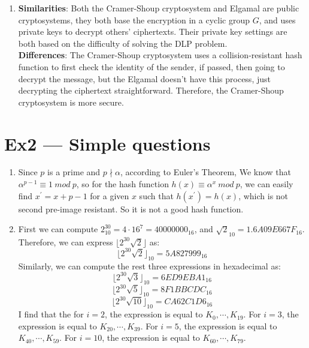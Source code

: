 \documentclass[12pt, a4paper]{article}
\begin{document}
\begin{enumerate}
    \item \textbf{Similarities}: Both the Cramer-Shoup cryptosystem and Elgamal are public cryptosystems, 
          they both base the encryption in a cyclic group $G$, and uses private keys to decrypt others' ciphertexts. 
          Their private key settings are both based on the difficulty of solving the DLP problem.\\
          \textbf{Differences}: The Cramer-Shoup cryptosystem uses a collision-resistant hash function 
          to first check the identity of the sender, if passed, then going to decrypt the message, 
          but the Elgamal doesn't have this process, just decrypting the ciphertext straightforward. 
          Therefore, the Cramer-Shoup cryptosystem is more secure.
\end{enumerate}

\section*{Ex2 --- Simple questions}
\begin{enumerate}
    \item Since $p$ is a prime and $p \nmid \alpha$, according to Euler's Theorem, 
          We know that $\alpha^{p-1} \equiv 1\ mod\ p$, so for the hash function $h(x) \equiv \alpha^x\ mod\ p$, 
          we can easily find $x^\prime = x + p - 1$ for a given $x$ such that $h(x^\prime) = h(x)$, 
          which is not second pre-image resistant. So it is not a good hash function.
    \item First we can compute $2^{30}_{10} = 4\cdot 16^7 = 40000000_{16}$, 
          and $\sqrt{2}_{10} = 1.6A09E667F_{16}$. Therefore, we can express $\lfloor 2^{30}\sqrt{2} \rfloor$ as:
          $$\lfloor 2^{30}\sqrt{2} \rfloor_{10} = 5A827999_{16}$$
          Similarly, we can compute the rest three expressions in hexadecimal as:
          $$\lfloor 2^{30}\sqrt{3} \rfloor_{10} = 6ED9EBA1_{16}$$
          $$\lfloor 2^{30}\sqrt{5} \rfloor_{10} = 8F1BBCDC_{16}$$
          $$\lfloor 2^{30}\sqrt{10} \rfloor_{10} = CA62C1D6_{16}$$
          I find that the for $i=2$, the expression is equal to $K_0,\cdots, K_{19}$. For $i=3$, 
          the expression is equal to $K_{20},\cdots,K_{39}$. For $i=5$, 
          the expression is equal to $K_{40},\cdots,K_{59}$. For $i=10$, 
          the expression is equal to $K_{60},\cdots,K_{79}$.

\end{enumerate}
\end{document}
